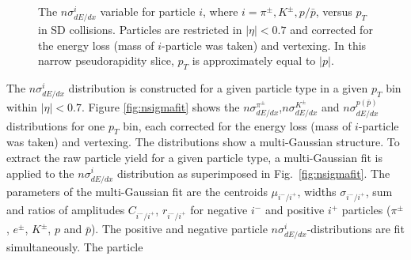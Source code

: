 \begin{figure}[H]
{			\begin{subfigure}[b]{\linewidth}{
					}
			\end{subfigure}
		}
	\caption[The $n\sigma^{i}_{dE/dx}$ variable versus $p_T$ in SD collisions]{The $n\sigma^{i}_{dE/dx}$ variable for particle $i$, where $i=\pi^\pm, K^\pm, p/\bar{p}$, versus $p_T$ in SD collisions. Particles are restricted in $|\eta| < 0.7$
		and corrected for the energy loss (mass of $i$-particle was taken) and vertexing. In
		this narrow pseudorapidity slice, $p_T$ is approximately
		equal to $|p|$.}
	\label{fig:nsigma}
\end{figure}
\noindent The $n\sigma^i_{dE/dx}$ distribution is constructed for a given particle
type in a given $p_T$ bin within $|\eta| < 0.7$. Figure \ref{fig:nsigmafit}
shows the $n\sigma^{\pi^\pm}_{dE/dx}$,$n\sigma^{K^\pm}_{dE/dx}$ and $n\sigma^{p(\bar{p})}_{dE/dx}$ distributions for one $p_T$ bin, each corrected for the energy loss\cite{commonnote} (mass of $i$-particle was taken) and vertexing. The distributions show a multi-Gaussian structure. To extract the raw particle yield for a given particle type,
a multi-Gaussian fit is applied to the $n\sigma^i_{dE/dx}$ distribution as
superimposed in Fig.~\ref{fig:nsigmafit}. The parameters of the multi-Gaussian fit are the centroids $\mu_{i^-/i^+}$, widths $\sigma_{i^-/i^+}$, sum  and ratios  of amplitudes $C_{i^-/i^+}$, $r_{i^-/i^+}$ for negative $i^-$ and positive $i^+$ particles ($\pi^\pm$, $e^\pm$, $K^\pm$, $p$ and $\bar{p}$). The positive and negative particle
$n\sigma^{i}_{dE/dx}$-distributions are fit simultaneously. The particle
